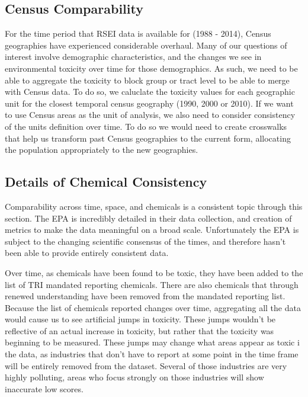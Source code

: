 \documentclass[12pt,twoside]{dukestatscithesis}
\theoremstyle{definition}
\theoremstyle{definition}
\theoremstyle{definition}
\theoremstyle{remark}
\begin{document}
\subsection{Census Comparability}\label{census-comparability}

For the time period that RSEI data is available for (1988 - 2014),
Census geographies have experienced considerable overhaul. Many of our
questions of interest involve demographic characteristics, and the
changes we see in environmental toxicity over time for those
demographics. As such, we need to be able to aggregate the toxicity to
block group or tract level to be able to merge with Census data. To do
so, we caluclate the toxicity values for each geographic unit for the
closest temporal census geography (1990, 2000 or 2010). If we want to
use Census areas as the unit of analysis, we also need to consider
consistency of the units definition over time. To do so we would need to
create crosswalks that help us transform past Census geographies to the
current form, allocating the population appropriately to the new
geographies.

\subsection{Details of Chemical
Consistency}\label{details-of-chemical-consistency}

Comparability across time, space, and chemicals is a consistent topic
through this section. The EPA is incredibly detailed in their data
collection, and creation of metrics to make the data meaningful on a
broad scale. Unfortunately the EPA is subject to the changing scientific
consensus of the times, and therefore hasn't been able to provide
entirely consistent data.

Over time, as chemicals have been found to be toxic, they have been
added to the list of TRI mandated reporting chemicals. There are also
chemicals that through renewed understanding have been removed from the
mandated reporting list. Because the list of chemicals reported changes
over time, aggregating all the data would cause us to see artificial
jumps in toxicity. These jumps wouldn't be reflective of an actual
increase in toxicity, but rather that the toxicity was beginning to be
measured. These jumps may change what areas appear as toxic i the data,
as industries that don't have to report at some point in the time frame
will be entirely removed from the dataset. Several of those industries
are very highly polluting, areas who focus strongly on those industries
will show inaccurate low scores.
\end{document}
